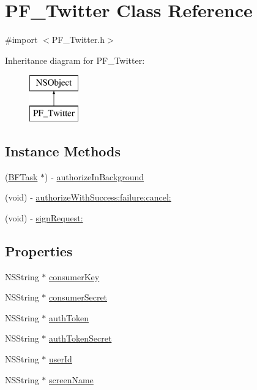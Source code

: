 \hypertarget{interface_p_f___twitter}{}\section{P\+F\+\_\+\+Twitter Class Reference}
\label{interface_p_f___twitter}


{\ttfamily \#import $<$P\+F\+\_\+\+Twitter.\+h$>$}

Inheritance diagram for P\+F\+\_\+\+Twitter\+:\begin{figure}[H]
\begin{center}
\leavevmode
\includegraphics[height=2.000000cm]{interface_p_f___twitter}
\end{center}
\end{figure}
\subsection*{Instance Methods}
\begin{DoxyCompactItemize}
\item 
(\hyperlink{interface_b_f_task}{B\+F\+Task} $\ast$) -\/ \hyperlink{interface_p_f___twitter_ab44d1e51b54da37a55056bdbb84cd782}{authorize\+In\+Background}
\item 
(void) -\/ \hyperlink{interface_p_f___twitter_a7a9a451aa7dfbaaf6e19c4bd69ba22dc}{authorize\+With\+Success\+:failure\+:cancel\+:}
\item 
(void) -\/ \hyperlink{interface_p_f___twitter_a3344db4a50a2d17afd180340dc4a2138}{sign\+Request\+:}
\end{DoxyCompactItemize}
\subsection*{Properties}
\begin{DoxyCompactItemize}
\item 
N\+S\+String $\ast$ \hyperlink{interface_p_f___twitter_abf8ce099ecc6b1ada8f4e00bdb263344}{consumer\+Key}
\item 
N\+S\+String $\ast$ \hyperlink{interface_p_f___twitter_a5cd32ce792aa0047289c40ef24495d87}{consumer\+Secret}
\item 
N\+S\+String $\ast$ \hyperlink{interface_p_f___twitter_a2f69919c3b94219d6a2d81746a2557ca}{auth\+Token}
\item 
N\+S\+String $\ast$ \hyperlink{interface_p_f___twitter_a9ed4e1e1544a9963d41d0f2df5520123}{auth\+Token\+Secret}
\item 
N\+S\+String $\ast$ \hyperlink{interface_p_f___twitter_a323160d0fafcc787ae3e7f705697e284}{user\+Id}
\item 
N\+S\+String $\ast$ \hyperlink{interface_p_f___twitter_abd234e6e32ffb958ff2e9a7176c28e63}{screen\+Name}
\end{DoxyCompactItemize}


